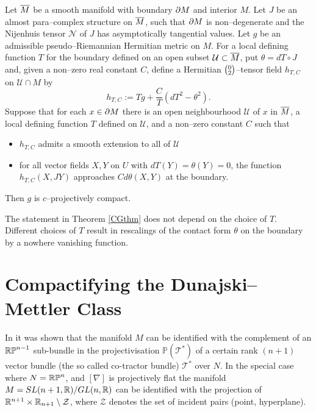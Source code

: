 \begin{theo}[\cite{CG}] \label{CGthm}
Let $\overline{M}$ be a smooth manifold with boundary $\partial M$ and interior $M$. Let $J$ be an almost para--complex structure on $\overline{M}$, such that $\partial M$ is non--degenerate and the Nijenhuis tensor $\mathcal{N}$ of $J$ has asymptotically tangential values. Let $g$ be an admissible pseudo--Riemannian Hermitian metric on $M$. For a local defining function $T$ for the boundary defined on an open 
subset ${\mathcal U}\subset \overline{M}$, put $\theta=dT\circ J$ and, given a non--zero real 
constant $C$, define a Hermitian $\big(\negthinspace\begin{smallmatrix}
0 \\ 2
\end{smallmatrix}\negthinspace\big)$--tensor field $h_{T,C}$ on 
${\mathcal U}\cap M$ by
\[
h_{T,C}:=Tg+\frac{C}{T}(dT^2-\theta^2).
\]
Suppose that for each $x\in\partial M$ there is an open neighbourhood 
${\mathcal{U}}$ of $x$ in $\overline{M}$, a local defining function $T$ defined on 
${\mathcal{U}}$, and a non--zero constant $C$ such that
\begin{itemize}
\item $h_{T,C}$ admits a smooth extension to all of $\mathcal{U}$
\item for all vector fields $X,Y$ on $U$ with $dT(Y)=\theta(Y)=0$, the function $h_{T,C}(X,JY)$ approaches $Cd\theta(X,Y)$ at the boundary.
\end{itemize}
Then $g$ is $c$--projectively compact.
\end{theo}
The statement in  Theorem \ref{CGthm} does not depend on the choice of $T$. Different choices of $T$ result in rescalings of the contact form $\theta$ on the boundary by a nowhere vanishing function.

\section{Compactifying the Dunajski--Mettler Class} 
\label{section_4}
\newcommand{\ol}[1]{\overline{#1}} \newcommand{\bp}{\boldsymbol{p}}
\newcommand{\cT}{\mathcal{T}} \newcommand{\cE}{\mathcal{E}} 

In \cite{DM} it was shown that the manifold $M$ can be identified with the
complement of
an $\mathbb{RP}^{n-1}$ sub-bundle in the  projectivisation $\mathbb{P}(\cT^*)$ of a certain rank $(n+1)$ vector bundle (the so called co-tractor bundle) $\cT^*$  
over $N$. In the special case where $N=\mathbb{RP}^n$, and $[\nabla]$ is projectively 
flat the manifold $M=SL(n+1, \mathbb{R})/GL(n, \mathbb{R})$ can be identified with the projection of $\mathbb{R}^{n+1}\times \mathbb{R}_{n+1}\setminus {\mathcal Z}$, where ${\mathcal Z}$ denotes the set
of incident pairs (point, hyperplane).

